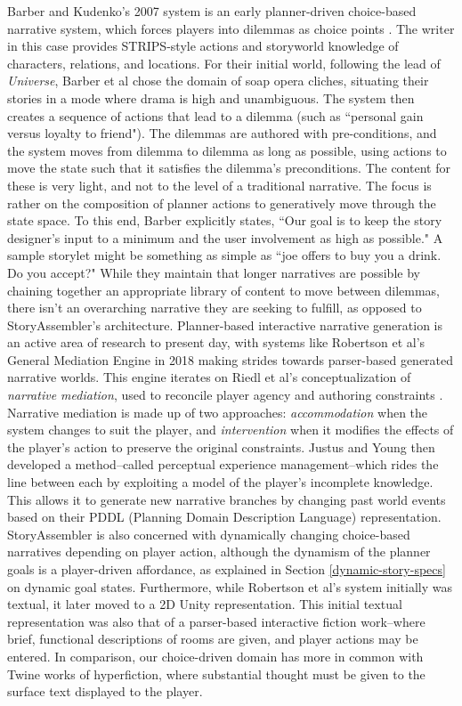 Barber and Kudenko's 2007 system is an early planner-driven choice-based narrative system, which forces players into dilemmas as choice points \cite{barber2007dynamic}. The writer in this case provides STRIPS-style actions and storyworld knowledge of characters, relations, and locations. For their initial world, following the lead of \textit{Universe}, Barber et al chose the domain of soap opera cliches, situating their stories in a mode where drama is high and unambiguous. The system then creates a sequence of actions that lead to a dilemma (such as ``personal gain versus loyalty to friend"). The dilemmas are authored with pre-conditions, and the system moves from dilemma to dilemma as long as possible, using actions to move the state such that it satisfies the dilemma's preconditions. The content for these is very light, and not to the level of a traditional narrative. The focus is rather on the composition of planner actions to generatively move through the state space. To this end, Barber explicitly states, ``Our goal is to keep the story designer’s input to a minimum and the user involvement as high as possible." A sample storylet might be something as simple as ``joe offers to buy you a drink. Do you accept?" While they maintain that longer narratives are possible by chaining together an appropriate library of content to move between dilemmas, there isn't an overarching narrative they are seeking to fulfill, as opposed to StoryAssembler's architecture.
Planner-based interactive narrative generation is an active area of research to present day, with systems like Robertson et al's General Mediation Engine \cite{justus} in 2018 making strides towards parser-based generated narrative worlds. This engine iterates on Riedl et al's conceptualization of \textit{narrative mediation}, used to reconcile player agency and authoring constraints \cite{riedl_mediation}. Narrative mediation is made up of two approaches: \textit{accommodation} when the system changes to suit the player, and \textit{intervention} when it modifies the effects of the player's action to preserve the original constraints. Justus and Young then developed a method--called perceptual experience management--which rides the line between each by exploiting a model of the player's incomplete knowledge. This allows it to generate new narrative branches by changing past world events based on their PDDL (Planning Domain Description Language)\cite{pddl} representation. StoryAssembler is also concerned with dynamically changing choice-based narratives depending on player action, although the dynamism of the planner goals is a player-driven affordance, as explained in Section \ref{dynamic-story-specs} on dynamic goal states. Furthermore, while Robertson et al's system initially was textual, it later moved to a 2D Unity representation. This initial textual representation was also that of a parser-based interactive fiction work--where brief, functional descriptions of rooms are given, and player actions may be entered. In comparison, our choice-driven domain has more in common with Twine works of hyperfiction, where substantial thought must be given to the surface text displayed to the player.
